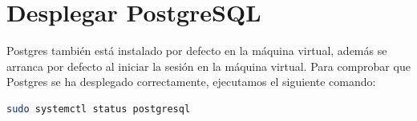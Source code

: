 \chapter{Desplegar PostgreSQL}

Postgres también está instalado por defecto en la máquina virtual, además se arranca por defecto al iniciar la sesión en la máquina virtual. Para comprobar que Postgres se ha desplegado correctamente, ejecutamos el siguiente comando:

\begin{lstlisting}[language=bash]
    sudo systemctl status postgresql
\end{lstlisting}

